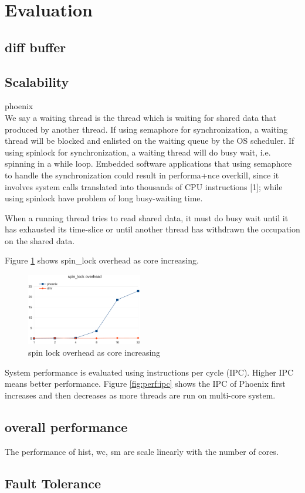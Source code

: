 \section{Evaluation}


\subsection{diff buffer}


\subsection{Scalability}
{\color{red}phoenix }
\\
We say a waiting thread is the thread which is waiting for shared
data that produced by another thread. If using semaphore for
synchronization, a waiting thread will be blocked and enlisted
on the waiting queue by the OS scheduler. If using spinlock
for synchronization, a waiting thread will do busy wait, i.e.
spinning in a while loop. Embedded software applications
that using semaphore to handle the synchronization could
result in performa+nce overkill, since it involves system calls
translated into thousands of CPU instructions [1]; while using
spinlock have problem of long busy-waiting time.

When a running thread tries to read shared data,
it must do busy wait until it has exhausted its time-slice
or until another thread has withdrawn the occupation on the
shared data. 


Figure \ref{fig:perf:spinlock} shows spin\_lock overhead
as core increasing.
\begin{figure}[!h!t]  
    \centering
    \includegraphics[width=0.45\textwidth]{eps/perf_spinlock.eps}
    \caption{spin lock overhead as core increasing}
    \label{fig:perf:spinlock}
\end{figure}



System performance is evaluated using
instructions per cycle (IPC). Higher IPC means
better performance.
Figure \ref{fig:perf:ipc} shows the IPC of Phoenix first increases 
and then decreases as more threads are run on multi-core system.


{\color{red}\myds }

\subsection{overall performance}


The performance of hist, wc, sm are scale linearly with the number of cores.
\subsection{Fault Tolerance}
